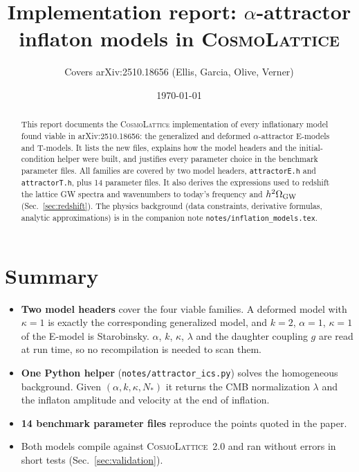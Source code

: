 \documentclass[11pt,a4paper]{article}
\title{Implementation report: $\alpha$-attractor inflaton models in \textsc{CosmoLattice}}
\author{Covers arXiv:2510.18656 (Ellis, Garcia, Olive, Verner)}
\date{\today}
\newcommand{\aatt}{\alpha}
\newcommand{\file}[1]{\texttt{#1}}
\begin{document}
\sloppy
\maketitle

\begin{abstract}
This report documents the \textsc{CosmoLattice} implementation of every inflationary model found viable in arXiv:2510.18656: the generalized and deformed $\alpha$-attractor E-models and T-models. It lists the new files, explains how the model headers and the initial-condition helper were built, and justifies every parameter choice in the benchmark parameter files. All families are covered by two model headers, \file{attractorE.h} and \file{attractorT.h}, plus 14 parameter files. It also derives the expressions used to redshift the lattice GW spectra and wavenumbers to today's frequency and $h^2\Omega_{\rm GW}$ (Sec.~\ref{sec:redshift}). The physics background (data constraints, derivative formulas, analytic approximations) is in the companion note \file{notes/inflation\_models.tex}.
\end{abstract}

\tableofcontents

\section{Summary}
\begin{itemize}
\item \textbf{Two model headers} cover the four viable families. A deformed model with $\kappa=1$ is exactly the corresponding generalized model, and $k=2$, $\aatt=1$, $\kappa=1$ of the E-model is Starobinsky. $\aatt$, $k$, $\kappa$, $\lambda$ and the daughter coupling $g$ are read at run time, so no recompilation is needed to scan them.
\item \textbf{One Python helper} (\file{notes/attractor\_ics.py}) solves the homogeneous background. Given $(\aatt,k,\kappa,N_*)$ it returns the CMB normalization $\lambda$ and the inflaton amplitude and velocity at the end of inflation.
\item \textbf{14 benchmark parameter files} reproduce the points quoted in the paper.
\item Both models compile against \textsc{CosmoLattice}~2.0 and ran without errors in short tests (Sec.~\ref{sec:validation}).
\end{itemize}
\end{document}
